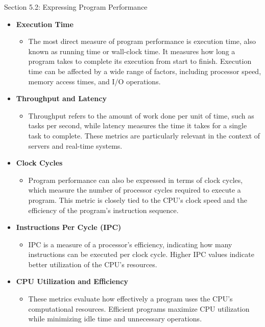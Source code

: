 \begin{notes}{Section 5.2: Expressing Program Performance}
    \begin{itemize}
        \item \textbf{Execution Time}
        \begin{itemize}
            \item The most direct measure of program performance is execution time, also known as running time or wall-clock time. It measures how long a program takes to complete its execution from 
            start to finish. Execution time can be affected by a wide range of factors, including processor speed, memory access times, and I/O operations.
        \end{itemize}
        \item \textbf{Throughput and Latency}
        \begin{itemize}
            \item Throughput refers to the amount of work done per unit of time, such as tasks per second, while latency measures the time it takes for a single task to complete. These metrics are 
            particularly relevant in the context of servers and real-time systems.
        \end{itemize}
        \item \textbf{Clock Cycles}
        \begin{itemize}
            \item Program performance can also be expressed in terms of clock cycles, which measure the number of processor cycles required to execute a program. This metric is closely tied to the 
            CPU's clock speed and the efficiency of the program's instruction sequence.
        \end{itemize}
        \item \textbf{Instructions Per Cycle (IPC)}
        \begin{itemize}
            \item IPC is a measure of a processor's efficiency, indicating how many instructions can be executed per clock cycle. Higher IPC values indicate better utilization of the CPU's resources.
        \end{itemize}
        \item \textbf{CPU Utilization and Efficiency}
        \begin{itemize}
            \item These metrics evaluate how effectively a program uses the CPU's computational resources. Efficient programs maximize CPU utilization while minimizing idle time and unnecessary operations.
        \end{itemize}

\end{itemize}
\end{notes}
